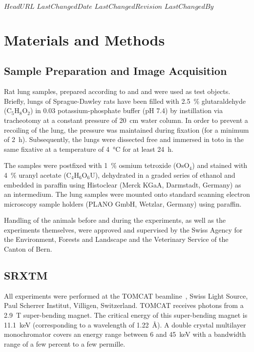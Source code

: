 \svnidlong
{$HeadURL$}
{$LastChangedDate$}
{$LastChangedRevision$}
{$LastChangedBy$}
%
%
\section{Materials and Methods}%
\label{sec:materials and methods}%
\subsection{Sample Preparation and Image Acquisition}%
Rat lung samples, prepared according to %
\ifhtml
	\citet{Tschanz2002} and \citet{Luyet2002}
\else
	 and 
\fi%
were used as test objects. Briefly, lungs of Sprague-Dawley rats have been filled with \SI{2.5}{\percent} glutaraldehyde (C$_5$H$_8$O$_2$) in \SI{0.03}{\Molar} potassium-phosphate buffer (pH 7.4) by instillation via tracheotomy at a constant pressure of \SI{20}{\centi\meter} water column. In order to prevent a recoiling of the lung, the pressure was maintained during fixation (for a minimum of \SI{2}{\hour}). Subsequently, the lungs were dissected free and immersed in toto in the same fixative at a temperature of \SI{4}{\celsius} for at least \SI{24}{\hour}.

The samples were postfixed with \SI{1}{\percent} osmium tetroxide (OsO$_4$) and stained with \SI{4}{\percent} uranyl acetate (C$_4$H$_6$O$_6$U), dehydrated in a graded series of ethanol and embedded in paraffin using Histoclear (Merck KGaA, Darmstadt, Germany) as an intermedium. The lung samples were mounted onto standard scanning electron microscopy sample holders (PLANO GmbH, Wetzlar, Germany) using paraffin.

Handling of the animals before and during the experiments, as well as the experiments themselves, were approved and supervised by the Swiss Agency for the Environment, Forests and Landscape and the Veterinary Service of the Canton of Bern.

\subsection{SRXTM}%
All experiments were performed at the TOMCAT beamline~\cite{Stampanoni2006a}, Swiss Light Source, Paul Scherrer Institut, Villigen, Switzerland. TOMCAT receives photons from a \SI{2.9}{\tesla} super-bending magnet. The critical energy of this super-bending magnet is \SI{11.1}{\kilo\electronvolt} (corresponding to a wavelength of \SI{1.22}{\angstrom}). A double crystal multilayer monochromator covers an energy range between 6 and \SI{45}{\kilo\electronvolt} with a bandwidth range of a few percent to a few permille.

